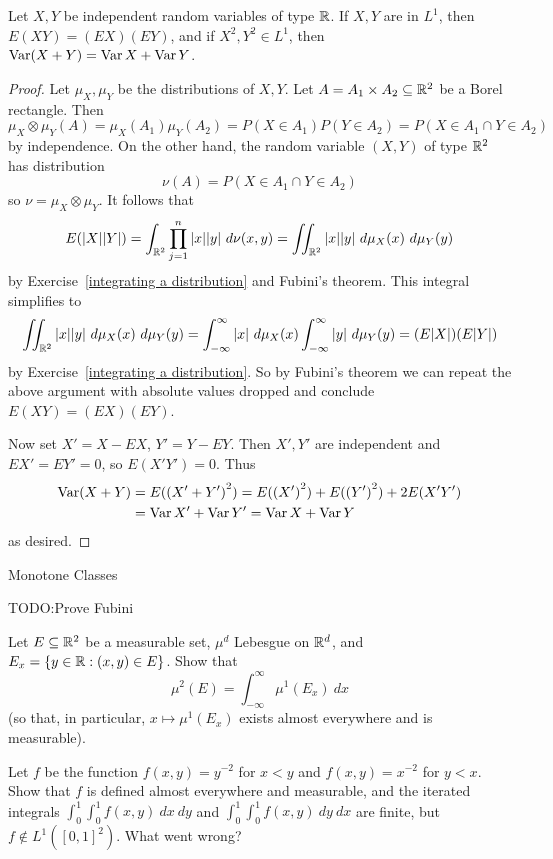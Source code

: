 \begin{corollary}
Let $X,Y$ be independent random variables of type $\mathbb{R}$. If $X,Y$ are in $L^{1}$, then $E(XY) = (EX)(EY)$, and if $X^{2}, Y^{2} \in L^{1}$, then $\operatorname{Var}(X+Y) = \operatorname{Var} X + \operatorname{Var} Y$.
\end{corollary}
\begin{proof}
Let $\mu_{X},\mu_{Y}$ be the distributions of $X,Y$.
Let $A = A_{1} \times A_{2} \subseteq \mathbb{R}^{2}$ be a Borel rectangle.
Then
\[\mu_{X} \otimes \mu_{Y}(A) = \mu_{X}(A_{1}) \mu_{Y}(A_{2}) = P(X \in A_{1}) P(Y \in A_{2}) = P(X \in A_{1} \cap Y \in A_{2})\]
by independence. On the other hand, the random variable $(X, Y)$ of type $\mathbb{R}^{2}$ has distribution
\[\nu(A) = P(X \in A_{1} \cap Y \in A_{2})\]
so $\nu = \mu_{X} \otimes \mu_{Y}$.
It follows that
\[E(|X||Y|) = \int_{\mathbb{R}^{2}} \prod_{j=1}^{n} |x||y| ~d\nu(x, y) = \iint_{\mathbb{R}^{2}} |x||y| ~d\mu_{X}(x)~d\mu_{Y}(y)\]
by Exercise~\ref{integrating a distribution} and Fubini's theorem. This integral simplifies to
\[\iint_{\mathbb{R}^{2}} |x||y| ~d\mu_{X}(x)~d\mu_{Y}(y) = \int_{-\infty}^{\infty} |x| ~d\mu_{X}(x) \int_{-\infty}^{\infty} |y| ~d\mu_{Y}(y) = (E|X|)(E|Y|)\]
by Exercise~\ref{integrating a distribution}.
So by Fubini's theorem we can repeat the above argument with absolute values dropped and conclude $E(XY) = (EX)(EY)$.

Now set $X' = X - EX$, $Y' = Y - EY$. Then $X',Y'$ are independent and $EX' = EY' = 0$, so $E(X'Y') = 0$.
Thus
\begin{align*}\operatorname{Var}(X + Y) &= E({(X' + Y')}^{2}) = E({(X')}^{2}) + E({(Y')}^{2}) + 2E(X'Y') \\
&= \operatorname{Var} X' + \operatorname{Var} Y' = \operatorname{Var} X + \operatorname{Var} Y
\end{align*}
as desired.
\end{proof}

Monotone Classes

TODO:\@ Prove Fubini

\begin{exercise}
Let $E \subseteq \mathbb{R}^{2}$ be a measurable set, $\mu^{d}$ Lebesgue on $\mathbb{R}^{d}$, and $E_{x} = \{y \in \mathbb{R}: (x, y) \in E\}$.
Show that
\[\mu^{2}(E) = \int_{-\infty}^{\infty} \mu^{1}(E_{x})~dx\]
(so that, in particular, $x \mapsto \mu^{1}(E_{x})$ exists almost everywhere and is measurable).
\end{exercise}

\begin{exercise}
Let $f$ be the function $f(x, y) = y^{-2}$ for $x < y$ and $f(x, y) = x^{-2}$ for $y < x$.
Show that $f$ is defined almost everywhere and measurable, and the iterated integrals $\int_{0}^{1}\int_{0}^{1} f(x,y)~dx~dy$ and $\int_{0}^{1}\int_{0}^{1} f(x,y)~dy~dx$ are finite, but $f \notin L^{1}({[0, 1]}^{2})$.
What went wrong?
\end{exercise}

